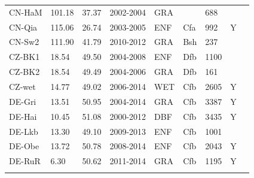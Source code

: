 \documentclass[gmd, manuscript]{copernicus}
\begin{document}
\begin{table}[t]
\begin{tabular}{lllllllll}
  CN-HaM & 101.18 & 37.37 & 2002-2004 & GRA &  & 688 &  & \citet{CN-HaM} \\ 
  CN-Qia & 115.06 & 26.74 & 2003-2005 & ENF & Cfa & 992 & Y & \citet{CN-Qia} \\ 
  CN-Sw2 & 111.90 & 41.79 & 2010-2012 & GRA & Bsh & 237 &  & \citet{CN-Sw2} \\ 
  CZ-BK1 & 18.54 & 49.50 & 2004-2008 & ENF & Dfb & 1100 &  & \citet{CZ-BK1} \\ 
  CZ-BK2 & 18.54 & 49.49 & 2004-2006 & GRA & Dfb & 161 &  & \citet{CZ-BK2} \\ 
  CZ-wet & 14.77 & 49.02 & 2006-2014 & WET & Cfb & 2605 & Y & \citet{CZ-wet} \\ 
  DE-Gri & 13.51 & 50.95 & 2004-2014 & GRA & Cfb & 3387 & Y & \citet{DE-Gri} \\ 
  DE-Hai & 10.45 & 51.08 & 2000-2012 & DBF & Cfb & 3435 & Y & \citet{DE-Hai} \\ 
  DE-Lkb & 13.30 & 49.10 & 2009-2013 & ENF & Cfb & 1001 &  & \citet{DE-Lkb} \\ 
  DE-Obe & 13.72 & 50.78 & 2008-2014 & ENF & Cfb & 2043 & Y & \citet{DE-Obe} \\ 
  DE-RuR & 6.30 & 50.62 & 2011-2014 & GRA & Cfb & 1195 & Y & \citet{DE-RuR} \\ 
    \bottomhline
\end{tabular}
\label{tab:sites1}
\end{table}
\clearpage
\end{document}
